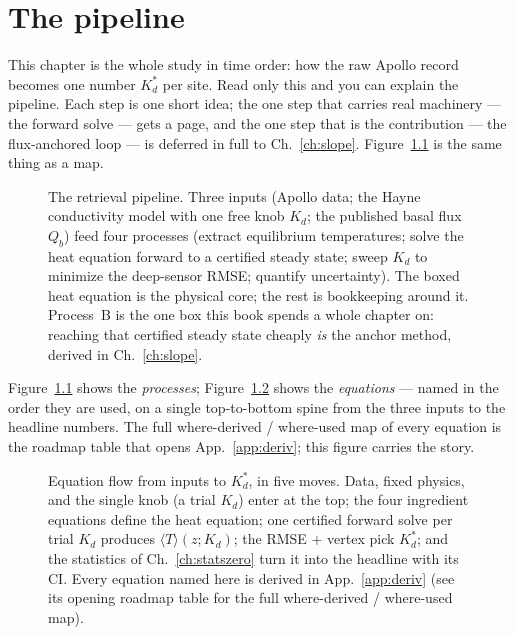 \documentclass[11pt]{report}
\newcommand{\Tm}{\langle T\rangle}
\begin{document}
\chapter{The pipeline}\label{ch:pipeline}

This chapter is the whole study in time order: how the raw Apollo record becomes
one number $K_d^{*}$ per site. Read only this and you can explain the pipeline.
Each step is one short idea; the one step that carries real machinery --- the
forward solve --- gets a page, and the one step that is the contribution --- the
flux-anchored loop --- is deferred in full to Ch.~\ref{ch:slope}.
Figure~\ref{fig:pipeline} is the same thing as a map.

\begin{figure}[htbp]\centering

\caption{The retrieval pipeline. Three inputs (Apollo data; the Hayne
conductivity model with one free knob $K_d$; the published basal flux $Q_b$)
feed four processes (extract equilibrium temperatures; solve the heat equation
forward to a certified steady state; sweep $K_d$ to minimize the deep-sensor
RMSE; quantify uncertainty). The boxed heat equation is the physical core; the
rest is bookkeeping around it. Process~B is the one box this book spends a whole
chapter on: reaching that certified steady state cheaply \emph{is} the anchor
method, derived in Ch.~\ref{ch:slope}.}
\label{fig:pipeline}
\end{figure}

Figure~\ref{fig:pipeline} shows the \emph{processes}; Figure~\ref{fig:eqnflow}
shows the \emph{equations} --- named in the order they are used, on a single
top-to-bottom spine from the three inputs to the headline numbers. The full
where-derived / where-used map of every equation is the roadmap table that opens
App.~\ref{app:deriv}; this figure carries the story.

\begin{figure}[p]\centering

\caption{Equation flow from inputs to $K_d^{*}$, in five moves. Data, fixed
physics, and the single knob (a trial $K_d$) enter at the top; the four
ingredient equations define the heat equation; one certified forward solve per
trial $K_d$ produces $\Tm(z;K_d)$; the RMSE + vertex pick $K_d^{*}$; and the
statistics of Ch.~\ref{ch:statszero} turn it into the headline with its CI.
Every equation named here is derived in App.~\ref{app:deriv} (see its opening
roadmap table for the full where-derived / where-used map).}
\label{fig:eqnflow}
\end{figure}
\end{document}
